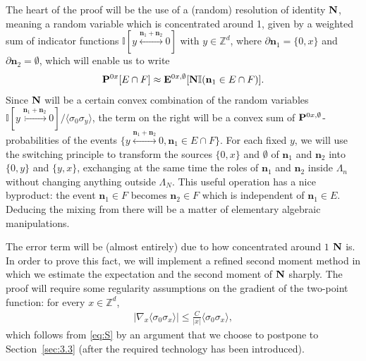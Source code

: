 \documentclass[a4paper,oneside,11pt]{article}
\def\Z{\mathbb{Z}}                          %
\newcommand{\be}[1]{\begin{equation}\label{#1}}
\newcommand{\ee}{\end{equation}}
\numberwithin{equation}{section}
\numberwithin{equation}{section}
\numberwithin{equation}{section}
\def\Z{\mathbb{Z}}                          %
\def\be{\begin{equation}}
\def\ee{\end{equation}}
\newcommand{\n}{\mathbf{n}}
\begin{document}
The heart of the proof will be the use of a (random) resolution of identity ${\bf N}$, meaning a random variable which is concentrated around 1, given by a weighted sum of indicator functions $\mathbb I[y\stackrel{\n_1+\n_2}\longleftrightarrow 0]$ with $y\in \mathbb Z^d$, where $\partial\n_1=\{0,x\}$ and $\partial\n_2=\emptyset$, which will enable us to write
\be
{\bf P}^{0x}[E\cap F]\approx{\bf E}^{0x,\emptyset}[{\bf N}\mathbb I(\n_1\in E\cap F)].
\ee
 Since ${\bf N}$ will be a certain convex combination of the random variables $\mathbb I[y\stackrel{\n_1+\n_2}{\longleftrightarrow}0]/\langle\sigma_0\sigma_y\rangle$, the term on the right will be a convex sum of 
${\bf P}^{0x,\emptyset}$-probabilities of the events $\{y\stackrel{\n_1+\n_2}{\longleftrightarrow}0,\n_1\in E\cap F\}$. For each fixed $y$, we will use the switching principle to transform the sources $\{0,x\}$ and $\emptyset$ of $\n_1$ and $\n_2$ into $\{0,y\}$ and $\{y,x\}$, exchanging at the same time the roles of $\n_1$ and $\n_2$ inside $\Lambda_n$ without changing anything outside $\Lambda_N$. This useful operation has a nice byproduct: the event $\n_1\in F$ becomes $\n_2\in F$ which is independent of $\n_1\in E$. Deducing the mixing from there will be a matter of elementary algebraic manipulations. 

The error term will be (almost entirely) due to how  concentrated around $1$ ${\bf N}$ is. In order to prove this fact, we will implement a refined second moment method in which we estimate the expectation  and the second moment of ${\bf N}$ sharply. The proof will require some regularity assumptions on the gradient of the two-point function: for every $x\in\Z^d$, 
\begin{align}
\label{eq:nabla S}|\nabla_x\langle\sigma_0\sigma_x\rangle|\le \frac{C}{|x|}\langle\sigma_0\sigma_x\rangle,
\end{align}
which  follows from \eqref{eq:S} by an argument that we choose to postpone to  Section~\ref{sec:3.3} (after the required technology has been introduced).
\end{document}
